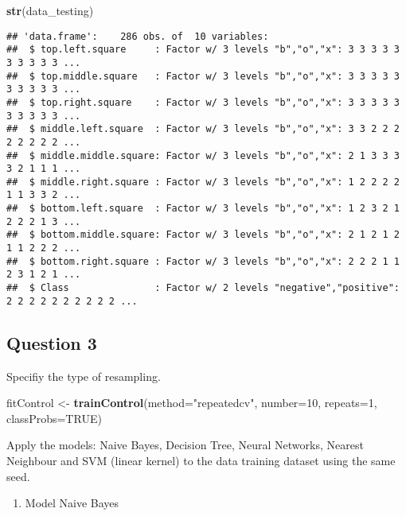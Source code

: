 \documentclass[]{article}
\newenvironment{Shaded}{\begin{snugshade}}{\end{snugshade}}
\newcommand{\DataTypeTok}[1]{\textcolor[rgb]{0.13,0.29,0.53}{#1}}
\newcommand{\DecValTok}[1]{\textcolor[rgb]{0.00,0.00,0.81}{#1}}
\newcommand{\KeywordTok}[1]{\textcolor[rgb]{0.13,0.29,0.53}{\textbf{#1}}}
\newcommand{\NormalTok}[1]{#1}
\newcommand{\OtherTok}[1]{\textcolor[rgb]{0.56,0.35,0.01}{#1}}
\newcommand{\StringTok}[1]{\textcolor[rgb]{0.31,0.60,0.02}{#1}}
\providecommand{\tightlist}{%
  \setlength{\itemsep}{0pt}\setlength{\parskip}{0pt}}
\begin{document}
\begin{Shaded}
\begin{Highlighting}[]
\KeywordTok{str}\NormalTok{(data_testing)}
\end{Highlighting}
\end{Shaded}

\begin{verbatim}
## 'data.frame':    286 obs. of  10 variables:
##  $ top.left.square     : Factor w/ 3 levels "b","o","x": 3 3 3 3 3 3 3 3 3 3 ...
##  $ top.middle.square   : Factor w/ 3 levels "b","o","x": 3 3 3 3 3 3 3 3 3 3 ...
##  $ top.right.square    : Factor w/ 3 levels "b","o","x": 3 3 3 3 3 3 3 3 3 3 ...
##  $ middle.left.square  : Factor w/ 3 levels "b","o","x": 3 3 2 2 2 2 2 2 2 2 ...
##  $ middle.middle.square: Factor w/ 3 levels "b","o","x": 2 1 3 3 3 3 2 1 1 1 ...
##  $ middle.right.square : Factor w/ 3 levels "b","o","x": 1 2 2 2 2 1 1 3 3 2 ...
##  $ bottom.left.square  : Factor w/ 3 levels "b","o","x": 1 2 3 2 1 2 2 2 1 3 ...
##  $ bottom.middle.square: Factor w/ 3 levels "b","o","x": 2 1 2 1 2 1 1 2 2 2 ...
##  $ bottom.right.square : Factor w/ 3 levels "b","o","x": 2 2 2 1 1 2 3 1 2 1 ...
##  $ Class               : Factor w/ 2 levels "negative","positive": 2 2 2 2 2 2 2 2 2 2 ...
\end{verbatim}

\hypertarget{question-3}{%
\subsection{Question 3}\label{question-3}}

Specifiy the type of resampling.

\begin{Shaded}
\begin{Highlighting}[]
\NormalTok{fitControl <-}\StringTok{ }\KeywordTok{trainControl}\NormalTok{(}\DataTypeTok{method=}\StringTok{"repeatedcv"}\NormalTok{, }
                           \DataTypeTok{number=}\DecValTok{10}\NormalTok{, }
                           \DataTypeTok{repeats=}\DecValTok{1}\NormalTok{,}
                           \DataTypeTok{classProbs=}\OtherTok{TRUE}\NormalTok{)}
\end{Highlighting}
\end{Shaded}

Apply the models: Naive Bayes, Decision Tree, Neural Networks, Nearest
Neighbour and SVM (linear kernel) to the data training dataset using the
same seed.

\begin{enumerate}
\def\labelenumi{\arabic{enumi}.}
\tightlist
\item
  Model Naive Bayes
\end{enumerate}
\end{document}
